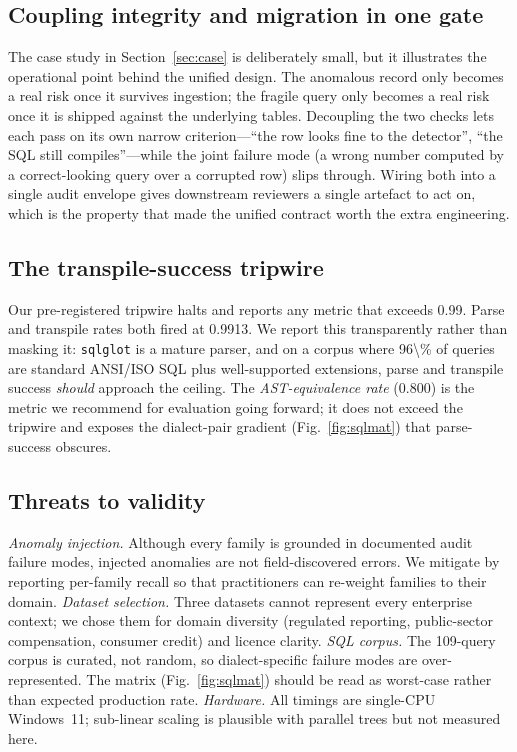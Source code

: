 \documentclass{ieeeaccess}
\begin{document}
\subsection{Coupling integrity and migration in one gate}
The case study in Section~\ref{sec:case} is deliberately small, but it illustrates the operational
point behind the unified design. The anomalous record only becomes a real risk once it survives
ingestion; the fragile query only becomes a real risk once it is shipped against the underlying
tables. Decoupling the two checks lets each pass on its own narrow criterion---``the row looks
fine to the detector'', ``the SQL still compiles''---while the joint failure mode (a wrong number
computed by a correct-looking query over a corrupted row) slips through. Wiring both into a single
audit envelope gives downstream reviewers a single artefact to act on, which is the property that
made the unified contract worth the extra engineering.

\subsection{The transpile-success tripwire}
Our pre-registered tripwire halts and reports any metric that exceeds \num{0.99}. Parse and transpile
rates both fired at \num{0.9913}. We report this transparently rather than masking it: \texttt{sqlglot}
is a mature parser, and on a corpus where \num{96\%} of queries are standard ANSI/ISO SQL plus
well-supported extensions, parse and transpile success \emph{should} approach the ceiling. The
\textit{AST-equivalence rate} (\num{0.800}) is the metric we recommend for evaluation going forward;
it does not exceed the tripwire and exposes the dialect-pair gradient (Fig.~\ref{fig:sqlmat}) that
parse-success obscures.

\subsection{Threats to validity}
\label{subsec:threats}
\textit{Anomaly injection.} Although every family is grounded in documented audit failure modes, injected
anomalies are not field-discovered errors. We mitigate by reporting per-family recall so that practitioners
can re-weight families to their domain.
\textit{Dataset selection.} Three datasets cannot represent every enterprise context; we chose them for
domain diversity (regulated reporting, public-sector compensation, consumer credit) and licence clarity.
\textit{SQL corpus.} The 109-query corpus is curated, not random, so dialect-specific failure modes are
over-represented. The matrix (Fig.~\ref{fig:sqlmat}) should be read as worst-case rather than expected
production rate.
\textit{Hardware.} All timings are single-CPU Windows~11; sub-linear scaling is plausible with parallel
trees but not measured here.
\end{document}
